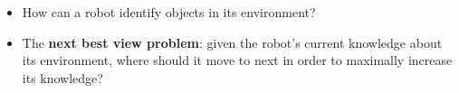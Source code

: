 
\large{
\begin{itemize}\itemsep36pt
	\item How can a robot identify objects in its environment?
	\item The \textbf{next best view problem}: given the robot's current knowledge about its environment, where should it move to next in order to maximally increase its knowledge?
\end{itemize}}